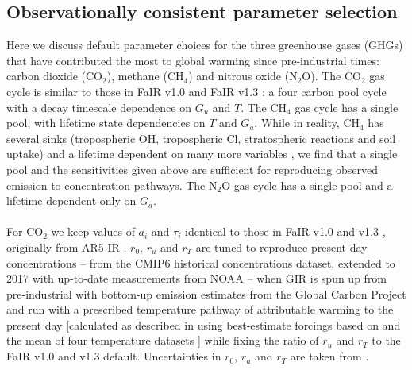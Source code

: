 \documentclass[gmd, manuscript]{copernicus}
\begin{document}
\subsection*{Observationally consistent parameter selection}
Here we discuss default parameter choices for the three greenhouse gases (GHGs) that have contributed the most to global warming since pre-industrial times: carbon dioxide (CO$_2$), methane (CH$_4$) and nitrous oxide (N$_2$O). The CO$_2$ gas cycle is similar to those in FaIR v1.0 \citep{Millar2016} and FaIR v1.3 \citep{Smith2017}: a four carbon pool cycle with a decay timescale dependence on $G_u$ and $T$. The CH$_4$ gas cycle has a single pool, with lifetime state dependencies on $T$ and $G_a$. While in reality, CH$_4$ has several sinks (tropospheric OH, tropospheric Cl, stratospheric reactions and soil uptake) and a lifetime dependent on many more variables \citep{Holmes2013}, we find that a single pool and the sensitivities given above are sufficient for reproducing observed emission to concentration pathways. The N$_2$O gas cycle has a single pool and a lifetime dependent only on $G_a$.\\\\
For CO$_2$ we keep values of $a_i$ and $\tau_i$ identical to those in FaIR v1.0 and v1.3 \citep{Millar2016,Smith2017}, originally from AR5-IR \citep{Myhre2013a}. $r_0$, $r_u$ and $r_T$ are tuned to reproduce present day concentrations -- from the CMIP6 historical concentrations dataset, extended to 2017 with up-to-date measurements from NOAA \citep{Meinshausen2017,Battle1996,Butler1999} -- when GIR is spun up from pre-industrial with bottom-up emission estimates from the Global Carbon Project \citep{Quere2018} and run with a prescribed temperature pathway of attributable warming to the present day [calculated as described in \cite{Haustein2017} using best-estimate forcings based on \cite{Forster2013} and the mean of four temperature datasets \citep{Vose2012,Cowtan2014,Lenssen2019,Morice2011}] while fixing the ratio of $r_u$ and $r_T$ to the FaIR v1.0 and v1.3 default. Uncertainties in $r_0$, $r_u$ and $r_T$ are taken from \cite{Millar2016}.\\\\
\end{document}
